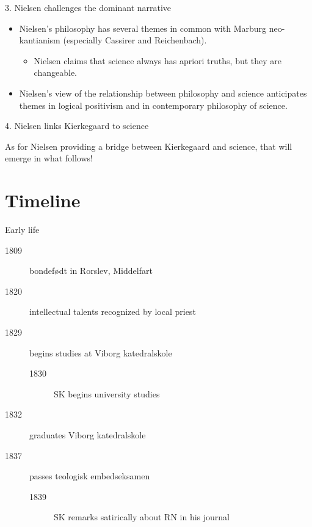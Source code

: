\documentclass[ignorenonframetext, ]{beamer}
\begin{document}
\begin{frame}{3. Nielsen challenges the dominant narrative}

\begin{itemize}
\item Nielsen's philosophy has several themes in common with Marburg
  neo-kantianism (especially Cassirer and Reichenbach).
  \begin{itemize}
  \item Nielsen claims that science always has apriori truths, but
    they are changeable.
  \end{itemize}
\item Nielsen's view of the relationship between philosophy and
  science anticipates themes in logical positivism and in contemporary
  philosophy of science.
\end{itemize}
\end{frame}

\begin{frame}{4. Nielsen links Kierkegaard to science}

  As for Nielsen providing a bridge between Kierkegaard and science,
  that will emerge in what follows!


\end{frame}

\section{Timeline}

\begin{frame}{Early life}

  \begin{description}
  \item[1809] bondefødt in Rorslev, Middelfart
  \item[1820] intellectual talents recognized by local priest
  \item[1829] begins studies at Viborg katedralskole
  \begin{description}
  \item[1830] SK begins university studies 
  \end{description}
\item[1832] graduates Viborg katedralskole
\item[1837] passes teologisk embedseksamen
  \begin{description}
  \item[1839] SK remarks satirically about RN in his
    journal \end{description}
\end{description}


\end{frame}
\end{document}
